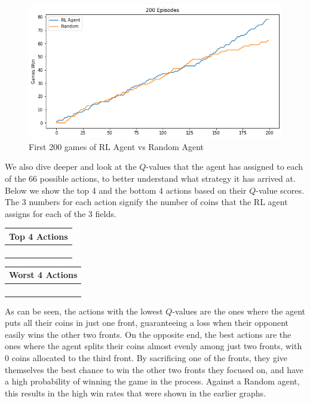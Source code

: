 \documentclass[11pt, oneside]{article}   	%
\begin{document}
\begin{figure}[h]
    \centering
    \includegraphics[scale=0.5]{./images/rl_random200.png}
    \caption{First 200 games of RL Agent vs Random Agent}
    \label{fig:mesh1}
\end{figure}

We also dive deeper and look at the $Q$-values that the agent has assigned to each of the 66 possible actions, to better understand what strategy it has arrived at. Below we show the top 4 and the bottom 4 actions based on their $Q$-value scores. The 3 numbers for each action signify the number of coins that the RL agent assigns for each of the 3 fields.

\hfill

\begin{center}
\begin{tabular}{ |c| } 
 \hline
 \textbf{Top 4 Actions} \\ 
 \hline
 [4, 0, 6] \\ 
 \hline
 [5, 0, 5] \\ 
 \hline
 [0, 4, 6] \\
 \hline
 [6, 1, 3] \\

 \hline
\end{tabular}
\quad
\begin{tabular}{ |c| } 
 \hline
\textbf{Worst 4 Actions} \\ 
 \hline
 [10, 0, 0]\\ 
 \hline
[0, 10, 0]\\
 \hline
[0, 8, 2]\\
 \hline
[0, 0, 10] \\
 \hline
\end{tabular}
\end{center}

\hfill

As can be seen, the actions with the lowest $Q$-values are the ones where the agent puts all their coins in just one front, guaranteeing a loss when their opponent easily wins the other two fronts. On the opposite end, the best actions are the ones where the agent splits their coins almost evenly among just two fronts, with 0 coins allocated to the third front. By sacrificing one of the fronts, they give themselves the best chance to win the other two fronts they focused on, and have a high probability of winning the game in the process. Against a Random agent, this results in the high win rates that were shown in the earlier graphs.
\end{document}
